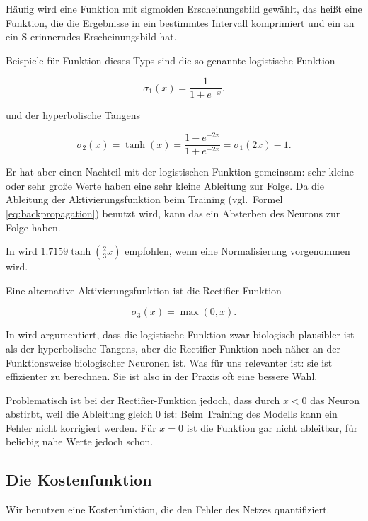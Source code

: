 Häufig wird eine Funktion mit sigmoiden Erscheinungsbild gewählt, das heißt eine Funktion, die die Ergebnisse in ein bestimmtes Intervall komprimiert und ein an ein S erinnerndes Erscheinungsbild hat. 

Beispiele für Funktion dieses Typs sind die so genannte logistische Funktion

\begin{equation}
\sigma_1(x) = \frac{1}{1+e^{-x}}.
\end{equation}

und der hyperbolische Tangens

\begin{equation}
\sigma_2(x) = \tanh(x) = \frac{1-e^{-2x}}{1+e^{-2x}} = 
\sigma_1(2x) -1.
\end{equation}

Er hat aber einen Nachteil mit der logistischen Funktion gemeinsam: sehr kleine oder sehr große Werte haben eine sehr kleine Ableitung zur Folge. Da die Ableitung der Aktivierungsfunktion beim Training (vgl.~Formel \ref{eq:backpropagation}) benutzt wird, kann das ein Absterben des Neurons zur Folge haben. 

In \cite{lecunefficient} wird $1.7159 \tanh(\frac{2}{3} x)$ empfohlen, wenn eine Normalisierung vorgenommen wird. 

Eine alternative Aktivierungsfunktion ist die Rectifier-Funktion 

\begin{equation}
\sigma_3(x) = \max(0,x).
\end{equation} 

In \cite{glorot2011deep} wird argumentiert, dass die logistische Funktion zwar biologisch plausibler ist als der hyperbolische Tangens, aber die Rectifier Funktion noch näher an der Funktionsweise biologischer Neuronen ist. Was für uns relevanter ist: sie ist effizienter zu berechnen. Sie ist also in der Praxis oft eine bessere Wahl. 

Problematisch ist bei der Rectifier-Funktion jedoch, dass durch $x < 0$ das Neuron abstirbt, weil die Ableitung gleich 0 ist: Beim Training des Modells kann ein Fehler nicht korrigiert werden. Für $x = 0$ ist die Funktion gar nicht ableitbar, für beliebig nahe Werte jedoch schon\cite{bengio2012practical}. 

\subsection{Die Kostenfunktion}
Wir benutzen eine Kostenfunktion, die den Fehler des Netzes quantifiziert.


